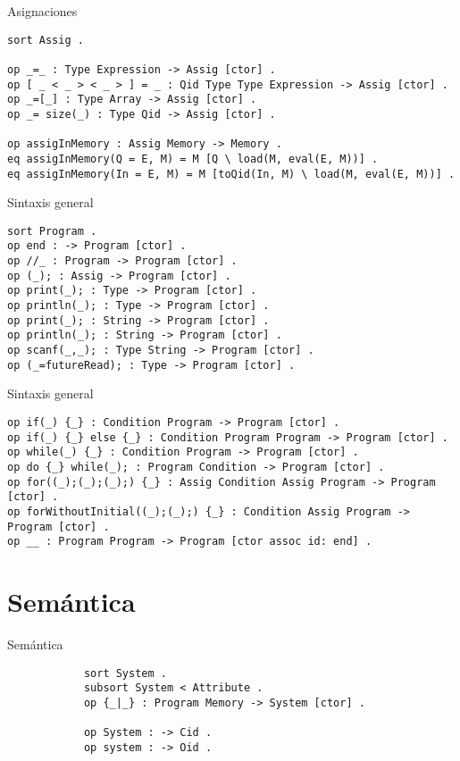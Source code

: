 \documentclass{beamer}
\begin{document}
    \begin{frame}[fragile]{Asignaciones}
        \begin{verbatim}
sort Assig .
 
op _=_ : Type Expression -> Assig [ctor] .
op [ _ < _ > < _ > ] = _ : Qid Type Type Expression -> Assig [ctor] .
op _=[_] : Type Array -> Assig [ctor] .
op _= size(_) : Type Qid -> Assig [ctor] .

op assigInMemory : Assig Memory -> Memory .
eq assigInMemory(Q = E, M) = M [Q \ load(M, eval(E, M))] .
eq assigInMemory(In = E, M) = M [toQid(In, M) \ load(M, eval(E, M))] .
        \end{verbatim}
    \end{frame}

    \begin{frame}[fragile]{Sintaxis general}
        \begin{verbatim}
sort Program .
op end : -> Program [ctor] .
op //_ : Program -> Program [ctor] .
op (_); : Assig -> Program [ctor] .
op print(_); : Type -> Program [ctor] .
op println(_); : Type -> Program [ctor] .
op print(_); : String -> Program [ctor] .
op println(_); : String -> Program [ctor] .
op scanf(_,_); : Type String -> Program [ctor] .
op (_=futureRead); : Type -> Program [ctor] .
        \end{verbatim}
    \end{frame}

    \begin{frame}[fragile]{Sintaxis general}
        \begin{verbatim}  
op if(_) {_} : Condition Program -> Program [ctor] .
op if(_) {_} else {_} : Condition Program Program -> Program [ctor] .
op while(_) {_} : Condition Program -> Program [ctor] .
op do {_} while(_); : Program Condition -> Program [ctor] .
op for((_);(_);(_);) {_} : Assig Condition Assig Program -> Program [ctor] .
op forWithoutInitial((_);(_);) {_} : Condition Assig Program -> Program [ctor] .
op __ : Program Program -> Program [ctor assoc id: end] .
        \end{verbatim}
    \end{frame}


    \section{Semántica}
    \begin{frame}[fragile]{Semántica}
        \begin{verbatim}  
            sort System .
            subsort System < Attribute .
            op {_|_} : Program Memory -> System [ctor] .

            op System : -> Cid . 
            op system : -> Oid . 
        \end{verbatim}
    \end{frame}
\end{document}
